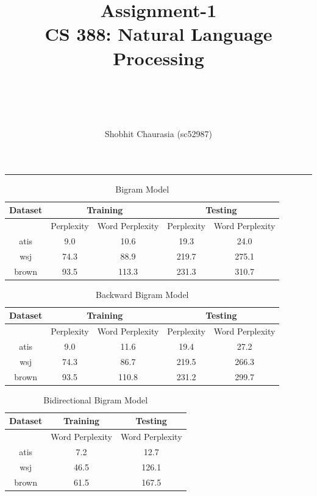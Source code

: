 \documentclass[12pt]{article}
\begin{document}
 
 
\title{Assignment-1\\ %
\large{CS 388: Natural Language Processing} %
\author{Shobhit Chaurasia {\small(sc52987)}} \\
\date{}
} %
 
\maketitle
\hrule
\begin{table}[h]
\caption{Bigram Model}
\label{table:forward}
\centering
  \begin{tabular}{|c|c|c|c|c|}
  \hline
  {\bf Dataset} & \multicolumn{2}{|c|}{{\bf Training}} & \multicolumn{2}{|c|}{{\bf Testing}} \\
  \hline 
  & Perplexity & Word Perplexity & Perplexity & Word Perplexity \\
  \hline
  atis & 9.0 & 10.6 & 19.3 & 24.0 \\
  wsj & 74.3 & 88.9 & 219.7 & 275.1 \\
  brown & 93.5 & 113.3 & 231.3 & 310.7 \\
  \hline
  \end{tabular}
\end{table}

\begin{table}[h]
\caption{Backward Bigram Model}
\label{table:backward}
\centering
  \begin{tabular}{|c|c|c|c|c|}
  \hline
  {\bf Dataset} & \multicolumn{2}{|c|}{{\bf Training}} & \multicolumn{2}{|c|}{{\bf Testing}} \\
  \hline 
  & Perplexity & Word Perplexity & Perplexity & Word Perplexity \\
  \hline
  atis & 9.0 & 11.6 & 19.4 & 27.2 \\
  wsj & 74.3 & 86.7 & 219.5 & 266.3 \\
  brown & 93.5 & 110.8 & 231.2 & 299.7 \\
  \hline
  \end{tabular}
\end{table}

\begin{table}[h]
\caption{Bidirectional Bigram Model}
\label{table:bidirectional}
\centering
  \begin{tabular}{|c|c|c|}
  \hline
  {\bf Dataset} & {\bf Training} & {\bf Testing} \\
  \hline 
  & Word Perplexity &  Word Perplexity \\
  \hline
  atis & 7.2 & 12.7 \\
  wsj & 46.5 & 126.1 \\
  brown & 61.5 & 167.5 \\
  \hline
  \end{tabular}
\end{table}
\end{document}
